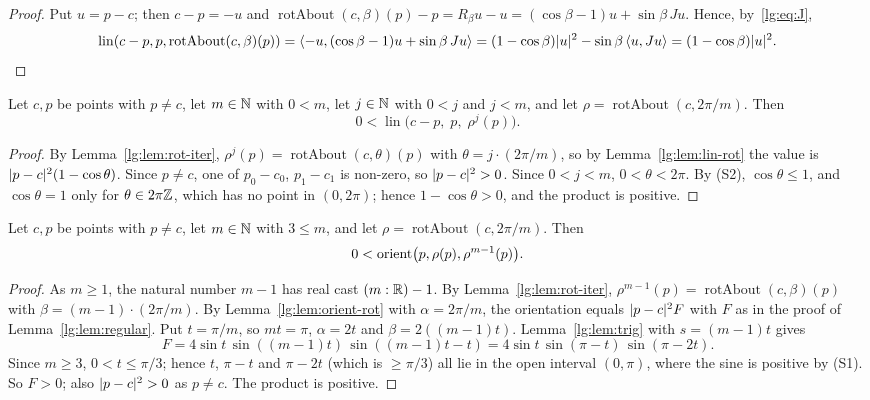 \begin{proof}
Put $u=p-c$; then $c-p=-u$ and $\operatorname{rotAbout}(c,\beta)(p)-p=R_\beta u-u=(\cos\beta-1)u+\sin\beta\,Ju$. Hence,
by~\eqref{lg:eq:J},
\[
  \operatorname{lin}(c-p,p,\operatorname{rotAbout}(c,\beta)(p))=\langle-u,(\cos\beta-1)u+\sin\beta\,Ju\rangle
  =(1-\cos\beta)\lvert u\rvert^2-\sin\beta\,\langle u,Ju\rangle=(1-\cos\beta)\lvert u\rvert^2.\qedhere
\]
\end{proof}

\begin{lemma}\label{lg:lem:lin-orbit}
Let $c,p$ be points with $p\ne c$, let $m\in\mathbb N$ with $0<m$, let $j\in\mathbb N$ with $0<j$ and $j<m$, and let
$\rho=\operatorname{rotAbout}(c,2\pi/m)$. Then
\[
  0<\operatorname{lin}\bigl(c-p,\;p,\;\rho^{j}(p)\bigr).
\]
\end{lemma}

\begin{proof}
By Lemma~\ref{lg:lem:rot-iter}, $\rho^{j}(p)=\operatorname{rotAbout}(c,\theta)(p)$ with $\theta=j\cdot(2\pi/m)$, so by
Lemma~\ref{lg:lem:lin-rot} the value is $\lvert p-c\rvert^2(1-\cos\theta)$. Since $p\ne c$, one of $p_0-c_0$, $p_1-c_1$ is
non-zero, so $\lvert p-c\rvert^2>0$. Since $0<j<m$, $0<\theta<2\pi$. By (S2), $\cos\theta\le1$, and $\cos\theta=1$ only for
$\theta\in2\pi\mathbb Z$, which has no point in $(0,2\pi)$; hence $1-\cos\theta>0$, and the product is positive.
\end{proof}

\begin{lemma}\label{lg:lem:next-prev}
Let $c,p$ be points with $p\ne c$, let $m\in\mathbb N$ with $3\le m$, and let $\rho=\operatorname{rotAbout}(c,2\pi/m)$. Then
\[
  0<\operatorname{orient}\bigl(p,\rho(p),\rho^{m-1}(p)\bigr).
\]
\end{lemma}

\begin{proof}
As $m\ge1$, the natural number $m-1$ has real cast $(m:\mathbb R)-1$. By Lemma~\ref{lg:lem:rot-iter},
$\rho^{m-1}(p)=\operatorname{rotAbout}(c,\beta)(p)$ with $\beta=(m-1)\cdot(2\pi/m)$. By Lemma~\ref{lg:lem:orient-rot}
with $\alpha=2\pi/m$, the orientation equals $\lvert p-c\rvert^2F$ with $F$ as in the proof of Lemma~\ref{lg:lem:regular}.
Put $t=\pi/m$, so $mt=\pi$, $\alpha=2t$ and $\beta=2((m-1)t)$. Lemma~\ref{lg:lem:trig} with $s=(m-1)t$ gives
\[
  F=4\sin t\,\sin((m-1)t)\,\sin((m-1)t-t)=4\sin t\,\sin(\pi-t)\,\sin(\pi-2t).
\]
Since $m\ge3$, $0<t\le\pi/3$; hence $t$, $\pi-t$ and $\pi-2t$ (which is $\ge\pi/3$) all lie in the open interval
$(0,\pi)$, where the sine is positive by (S1). So $F>0$; also $\lvert p-c\rvert^2>0$ as $p\ne c$. The product is positive.
\end{proof}

